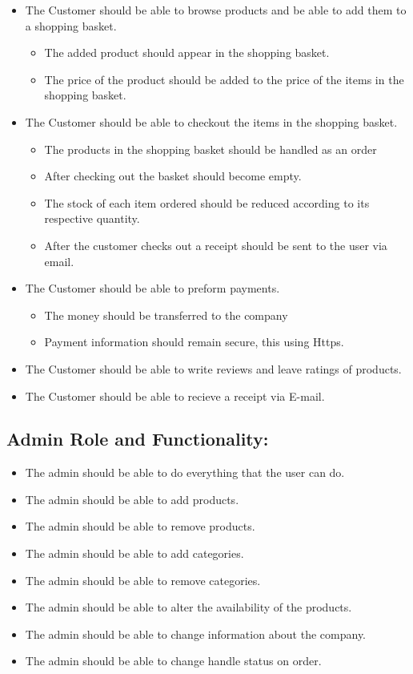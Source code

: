 \begin{itemize}
    \item The Customer should be able to browse products and be able to add
    them to a shopping basket.
    \begin{itemize}
        \item The added product should appear in the shopping basket.
        \item The price of the product should be added to the price of the
        items in the shopping basket.
    \end{itemize}
\item The Customer should be able to checkout the items in the shopping basket.
    \begin{itemize}
        \item The products in the shopping basket should be handled as an order
        \item After checking out the basket should become empty.
        \item The stock of each item ordered should be reduced according to
        its respective quantity.
        \item After the customer checks out a receipt should be sent to the
        user via email.
    \end{itemize}
\item The Customer should be able to preform payments.
    \begin{itemize}
        \item The money should be transferred to the company
        \item Payment information should remain secure, this using Https.
    \end{itemize}
    \item The Customer should be able to write reviews and leave ratings
    of products.
    \item The Customer should be able to recieve a receipt via E-mail. 
\end{itemize}

\subsection{Admin Role and Functionality:}

\begin{itemize}
    \item The admin should be able to do everything that the user can do.
    \item The admin should be able to add products.
    \item The admin should be able to remove products. 
    \item The admin should be able to add categories. 
    \item The admin should be able to remove categories. 
    \item The admin should be able to alter the availability of the products. 
    \item The admin should be able to change information about the company.
    \item The admin should be able to change handle status on order.
\end{itemize}
